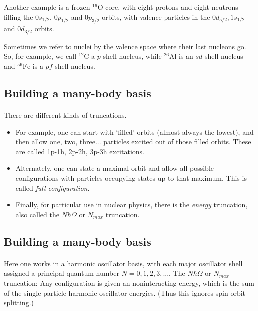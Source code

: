 Another example is a frozen $^{16}\mbox{O}$ core, with eight protons and eight neutrons filling the 
$0s_{1/2}$,  $0p_{1/2}$ and $0p_{3/2}$ orbits, with valence particles in the 
$0d_{5/2}, 1s_{1/2}$ and $0d_{3/2}$ orbits.

Sometimes we refer to nuclei by the valence space where their last nucleons go.  
So, for example, we call $^{12}\mbox{C}$ a $p$-shell nucleus, while $^{26}\mbox{Al}$ is an 
$sd$-shell nucleus and $^{56}\mbox{Fe}$ is a $pf$-shell nucleus.



\subsection*{Building a many-body basis}

\paragraph{}
There are different kinds of truncations.

\begin{itemize}
\item For example, one can start with `filled' orbits (almost always the lowest), and then  allow one, two, three... particles excited out of those filled orbits. These are called  1p-1h, 2p-2h, 3p-3h excitations. 

\item Alternately, one can state a maximal orbit and allow all possible configurations with  particles occupying states up to that maximum. This is called \emph{full configuration}.

\item Finally, for particular use in nuclear physics, there is the \emph{energy} truncation, also  called the $N\hbar\Omega$ or $N_{max}$ truncation. 
\end{itemize}

\noindent



\subsection*{Building a many-body basis}

\paragraph{}
Here one works in a harmonic oscillator basis, with each major oscillator shell assigned  a principal quantum number $N=0,1,2,3,...$. 
The $N\hbar\Omega$ or $N_{max}$ truncation: Any configuration is given an noninteracting energy, which is the sum 
of the single-particle harmonic oscillator energies. (Thus this ignores 
spin-orbit splitting.)

